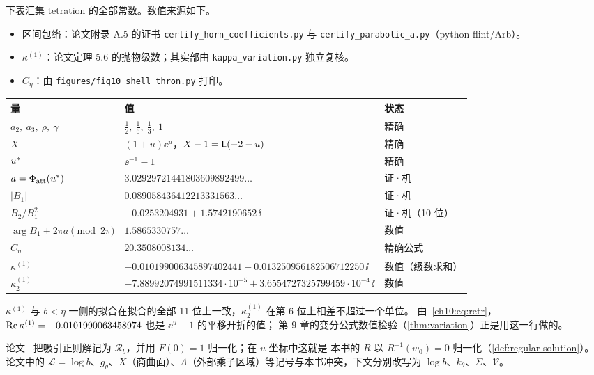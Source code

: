 \begin{example}\label{ch10:ex:constants}
下表汇集 tetration 的全部常数。数值来源如下。
\begin{itemize}\sloppy
\item 区间包络：论文附录 A.5 的证书 \texttt{certify\_horn\_coefficients.py} 与 \texttt{certify\_parabolic\_a.py}（python-flint/Arb）。
\item $\kappa^{(1)}$：论文定理 5.6 的抛物级数；其实部由 \texttt{kappa\_variation.py} 独立复核。
\item $C_\eta$：由 \texttt{figures/fig10\_shell\_thron.py} 打印。
\end{itemize}
\begin{center}\footnotesize
\begin{tabular}{lll}
\toprule
量 & 值 & 状态\\
\midrule
$a_2,\ a_3,\ \rho,\ \gamma$ & $\tfrac12,\ \tfrac16,\ \tfrac13,\ 1$ & 精确\\
$X$ & $(1+u)\ee^u$，$X-1=\mathsf L(-2-u)$ & 精确\\
$u^{*}$ & $\ee^{-1}-1$ & 精确\\
$a=\Phi_{\mathrm{att}}(u^{*})$ & $3.02929721441803609892499\ldots$ & 证·机\\
$|B_1|$ & $0.089058436412213331563\ldots$ & 证·机\\
$B_2/B_1^2$ & $-0.0253204931+1.5742190652\,\ii$ & 证·机（10 位）\\
$\arg B_1+2\pi a\pmod{2\pi}$ & $1.5865330757\ldots$ & 数值\\
$C_\eta$ & $20.3508008134\ldots$ & 精确公式\\
$\kappa^{(1)}$ & $-0.010199006345897402441-0.013250956182506712250\,\ii$ & 数值（级数求和）\\
$\kappa^{(1)}_2$ & $-7.88992074991511334\cdot10^{-5}+3.6554727325799459\cdot10^{-4}\,\ii$ & 数值\\
\bottomrule
\end{tabular}
\end{center}
$\kappa^{(1)}$ 与 $b<\eta$ 一侧的拟合在拟合的全部 11 位上一致，$\kappa^{(1)}_2$ 在第 6 位上相差不超过一个单位。
由~\eqref{ch10:eq:retr}，$\operatorname{Re}\kappa^{(1)}=-0.0101990063458974$ 也是 $\ee^u-1$ 的平移开折的值；
第 9 章的变分公式数值检验（\cref{thm:variation}）正是用这一行做的。
\end{example}

\begin{remark}[记号]\label{ch10:rem:notation}
论文~\cite{KneserPaper} 把吸引正则解记为 $\mathcal R_b$，并用 $F(0)=1$ 归一化；在 $u$ 坐标中这就是
本书的 $R$ 以 $R^{-1}(w_0)=0$ 归一化（\cref{def:regular-solution}）。
论文中的 $\mathcal L=\log b$、$g_\theta$、$X$（商曲面）、$\Lambda$（外部乘子区域）等记号与本书冲突，下文分别改写为 $\log b$、$k_\theta$、$\Sigma$、$\mathcal V$。
\end{remark}

